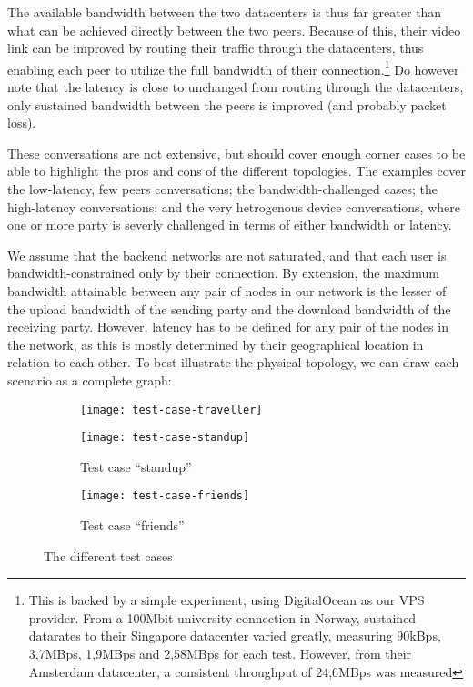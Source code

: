 The available bandwidth between the two datacenters is thus far greater than what can be achieved directly between the two peers. Because of this, their video link can be improved by routing their traffic through the datacenters, thus enabling each peer to utilize the full bandwidth of their connection.\footnote{This is backed by a simple experiment, using DigitalOcean as our VPS provider. From a 100Mbit university connection in Norway, sustained datarates to their Singapore datacenter varied greatly, measuring 90kBps, 3,7MBps, 1,9MBps and 2,58MBps for each test. However, from their Amsterdam datacenter, a consistent throughput of 24,6MBps was measured} Do however note that the latency is close to unchanged from routing through the datacenters, only sustained bandwidth between the peers is improved (and probably packet loss).

These conversations are not extensive, but should cover enough corner cases to be able to highlight the pros and cons of the different topologies. The examples cover the low-latency, few peers conversations; the bandwidth-challenged cases; the high-latency conversations; and the very hetrogenous device conversations, where one or more party is severly challenged in terms of either bandwidth or latency.

We assume that the backend networks are not saturated, and that each user is bandwidth-constrained only by their connection. By extension, the maximum bandwidth attainable between any pair of nodes in our network is the lesser of the upload bandwidth of the sending party and the download bandwidth of the receiving party. However, latency has to be defined for any pair of the nodes in the network, as this is mostly determined by their geographical location in relation to each other. To best illustrate the physical topology, we can draw each scenario as a complete graph:

\begin{figure}
    \begin{subfigure}{\textwidth}
        \centering
        \texttt{[image: test-case-traveller]}
        \label{fig:test-case-traveller}
    \end{subfigure}

    \begin{subfigure}{\textwidth}
        \centering
        \texttt{[image: test-case-standup]}
        \caption{Test case ``standup''}\label{fig:test-case-standup}
    \end{subfigure}

    \begin{subfigure}{\textwidth}
        \centering
        \texttt{[image: test-case-friends]}
        \caption{Test case ``friends''}\label{fig:test-case-friends}
    \end{subfigure}
    \caption{The different test cases}
    \label{fig:test-cases}
\end{figure}
